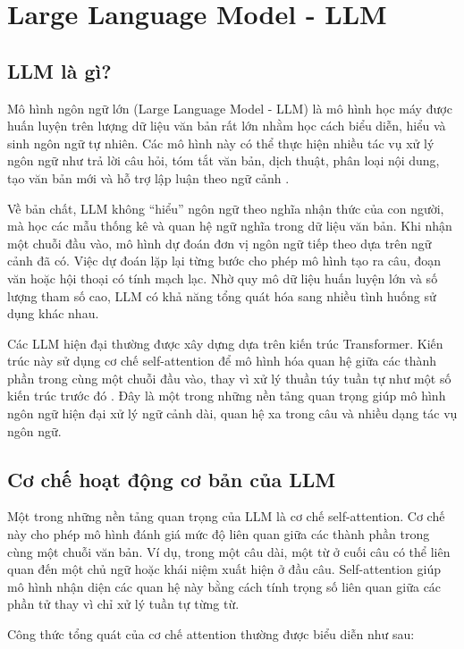 \documentclass[12pt,a4paper]{report}
\begin{document}
\section{Large Language Model - LLM}

\subsection{LLM là gì?}

Mô hình ngôn ngữ lớn (Large Language Model - LLM) là mô hình học máy được huấn luyện trên lượng dữ liệu văn bản rất lớn nhằm học cách biểu diễn, hiểu và sinh ngôn ngữ tự nhiên. Các mô hình này có thể thực hiện nhiều tác vụ xử lý ngôn ngữ như trả lời câu hỏi, tóm tắt văn bản, dịch thuật, phân loại nội dung, tạo văn bản mới và hỗ trợ lập luận theo ngữ cảnh \cite{zhao2023llmSurvey}.

Về bản chất, LLM không ``hiểu'' ngôn ngữ theo nghĩa nhận thức của con người, mà học các mẫu thống kê và quan hệ ngữ nghĩa trong dữ liệu văn bản. Khi nhận một chuỗi đầu vào, mô hình dự đoán đơn vị ngôn ngữ tiếp theo dựa trên ngữ cảnh đã có. Việc dự đoán lặp lại từng bước cho phép mô hình tạo ra câu, đoạn văn hoặc hội thoại có tính mạch lạc. Nhờ quy mô dữ liệu huấn luyện lớn và số lượng tham số cao, LLM có khả năng tổng quát hóa sang nhiều tình huống sử dụng khác nhau.

Các LLM hiện đại thường được xây dựng dựa trên kiến trúc Transformer. Kiến trúc này sử dụng cơ chế self-attention để mô hình hóa quan hệ giữa các thành phần trong cùng một chuỗi đầu vào, thay vì xử lý thuần túy tuần tự như một số kiến trúc trước đó \cite{vaswani2017attention}. Đây là một trong những nền tảng quan trọng giúp mô hình ngôn ngữ hiện đại xử lý ngữ cảnh dài, quan hệ xa trong câu và nhiều dạng tác vụ ngôn ngữ.

\subsection{Cơ chế hoạt động cơ bản của LLM}

Một trong những nền tảng quan trọng của LLM là cơ chế self-attention. Cơ chế này cho phép mô hình đánh giá mức độ liên quan giữa các thành phần trong cùng một chuỗi văn bản. Ví dụ, trong một câu dài, một từ ở cuối câu có thể liên quan đến một chủ ngữ hoặc khái niệm xuất hiện ở đầu câu. Self-attention giúp mô hình nhận diện các quan hệ này bằng cách tính trọng số liên quan giữa các phần tử thay vì chỉ xử lý tuần tự từng từ.

Công thức tổng quát của cơ chế attention thường được biểu diễn như sau:
\end{document}

